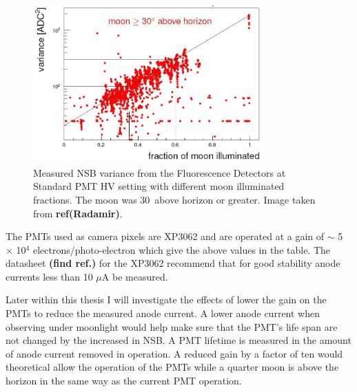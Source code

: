 \begin{figure}
\centering
\includegraphics[width=0.8\textwidth]{chapters/pix/SelEff/BGLoop_Variance_crop.jpg}
\caption{Measured NSB variance from the Fluorescence Detectors at Standard PMT HV setting with different moon illuminated fractions. The moon was 30\textdegree \ above horizon or greater. Image taken from \textbf{ref(Radamir)}.}
\end{figure}

The PMTs used as camera pixels are XP3062 and are operated at a gain of $\sim$ 5 $\times$ 10$^4$ electrons/photo-electron which give the above values in the table. The datasheet \textbf{(find ref.)} for the XP3062 recommend that for good stability anode currents less than 10 $\mu$A be measured. 
  
Later within this thesis I will investigate the effects of lower the gain on the PMTs to reduce the measured anode current. A lower anode current when observing under moonlight would help make sure that the PMT's life span are not changed by the increased in NSB. A PMT lifetime is measured in the amount of anode current removed in operation. A reduced gain by a factor of ten would theoretical allow the operation of the PMTs while a quarter moon is above the horizon in the same way as the current PMT operation.  

